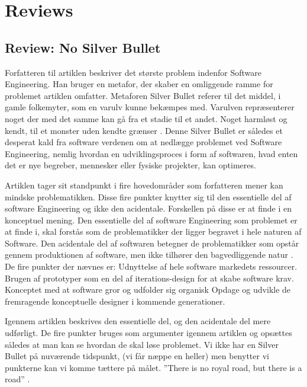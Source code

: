\documentclass[a4paper,12pt]{article}
\begin{document}
\section{Reviews}
\subsection{Review: No Silver Bullet}
Forfatteren til artiklen beskriver det største problem indenfor Software Engineering. Han bruger en metafor, der skaber en omliggende ramme for problemet artiklen omfatter. Metaforen Silver Bullet referer til det middel, i gamle folkemyter, som en varulv kunne  bekæmpes med. Varulven repræsenterer noget der med det samme kan gå fra et stadie til et andet. Noget harmløst og kendt, til et monster uden kendte grænser \cite[side~181]{nsb}. Denne Silver Bullet er således et desperat kald fra software verdenen om at nedlægge problemet ved Software Engineering, nemlig hvordan en udviklingsproces i form af softwaren, hvad enten det er nye begreber, mennesker eller fysiske projekter, kan optimeres. 

Artiklen tager sit standpunkt i fire hovedområder som forfatteren mener kan mindske problematikken. Disse fire punkter knytter sig til den essentielle del af software Engineering og ikke den acidentale. Forskellen på disse er at finde i en konceptuel mening. Den essentielle del af software Engineering som problemet er at finde i, skal forstås som de problematikker der ligger begravet i hele naturen af Software. Den acidentale del af softwaren betegner de problematikker som opstår gennem produktionen af software, men ikke tilhører den bagvedliggende natur \cite[side~182]{nsb}.
\newline
\newline
De fire punkter  der nævnes er:
\newline
Udnyttelse af hele software markedets ressourcer.
\newline
Brugen af prototyper som en del af iterations-design for at skabe software krav.
\newline
Konceptet med at software gror og udfolder sig organisk
\newline
Opdage og udvikle de fremragende konceptuelle designer i kommende generationer.
\cite[side~180]{nsb}

Igennem artiklen beskrives den essentielle del, og den acidentale del mere udførligt. De fire punkter bruges som argumenter igennem artiklen og opsættes således at man kan se hvordan de skal løse problemet. 
Vi ikke har en Silver Bullet på nuværende tidspunkt, (vi får næppe en heller) men benytter vi punkterne kan vi komme tættere på målet. ”There is no royal road, but there is a road” \cite[side~181]{nsb}.
\end{document}
